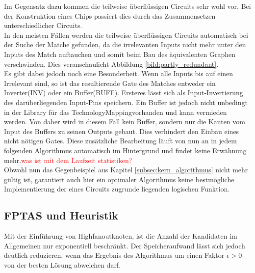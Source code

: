 \documentclass[11pt, a4paper, german]{article}
\newcommand{\TM}{TechnologyMapping}
\begin{document}
Im Gegensatz dazu kommen die teilweise überflüssigen Circuits sehr wohl vor. Bei der Konstruktion eines Chips passiert dies durch das Zusammensetzen unterschiedlicher Circuits.\\
In den meisten Fällen werden die teilweise überflüssigen Circuits automatisch bei der  Suche der Matche gefunden, da die irrelevanten Inputs nicht mehr unter den Inputs des Match auftauchen und somit beim Bau des äquivalenten Graphen verschwinden. Dies veranschaulicht Abbildung \ref{bild:partly_redundant}. \\
Es gibt dabei jedoch noch eine Besonderheit. Wenn alle Inputs bis auf einen Irrelevant sind, so ist das resultierende Gate des Matches entweder ein Inverter(INV) oder ein Buffer(BUFF). Ersteres lässt sich als Input-Invertierung des darüberliegenden Input-Pins speichern. Ein Buffer ist jedoch nicht unbedingt in der Library für das \TM vorhanden und kann vermieden werden. Von daher wird in diesem Fall kein Buffer, sondern nur die Kanten vom Input des Buffers zu seinen Outputs gebaut. Dies verhindert den Einbau eines nicht nötigen Gates. Diese zusätzliche Bearbeitung läuft von nun an in jedem folgenden Algorithmus automatisch im Hintergrund und findet keine Erwähnung mehr.\textcolor{red}{was ist mit dem Laufzeit statistiken?}\\
 Obwohl nun das Gegenbeispiel aus Kapitel \ref{subsec:kern_algorithmus} nicht mehr gültig ist, garantiert auch hier ein optimaler Algorithmus keine bestmögliche Implementierung der eines Circuits zugrunde liegenden logischen Funktion.
 
\subsection{FPTAS und Heuristik}
\label{subsec:fptas}
Mit der Einführung von Highfanoutknoten, ist die Anzahl der Kandidaten im Allgemeinen nur exponentiell beschränkt. Der Speicheraufwand lässt sich jedoch deutlich reduzieren, wenn das Ergebnis des Algorithmus um einen Faktor $\epsilon > 0$ von der besten Lösung abweichen darf. \\
\end{document}
